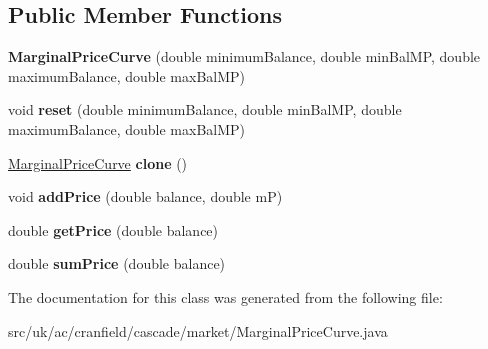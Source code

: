 \subsection*{Public Member Functions}
\begin{DoxyCompactItemize}
\item 
\hypertarget{classuk_1_1ac_1_1cranfield_1_1cascade_1_1market_1_1_marginal_price_curve_a9d3e21ff05f308a2d8e93e5d54ca2c58}{{\bfseries Marginal\-Price\-Curve} (double minimum\-Balance, double min\-Bal\-M\-P, double maximum\-Balance, double max\-Bal\-M\-P)}\label{classuk_1_1ac_1_1cranfield_1_1cascade_1_1market_1_1_marginal_price_curve_a9d3e21ff05f308a2d8e93e5d54ca2c58}

\item 
\hypertarget{classuk_1_1ac_1_1cranfield_1_1cascade_1_1market_1_1_marginal_price_curve_a3e026f921c7166c93d4b73e93561203e}{void {\bfseries reset} (double minimum\-Balance, double min\-Bal\-M\-P, double maximum\-Balance, double max\-Bal\-M\-P)}\label{classuk_1_1ac_1_1cranfield_1_1cascade_1_1market_1_1_marginal_price_curve_a3e026f921c7166c93d4b73e93561203e}

\item 
\hypertarget{classuk_1_1ac_1_1cranfield_1_1cascade_1_1market_1_1_marginal_price_curve_a294216c11b9e3c4a9d4b982fb4ccd98b}{\hyperlink{classuk_1_1ac_1_1cranfield_1_1cascade_1_1market_1_1_marginal_price_curve}{Marginal\-Price\-Curve} {\bfseries clone} ()}\label{classuk_1_1ac_1_1cranfield_1_1cascade_1_1market_1_1_marginal_price_curve_a294216c11b9e3c4a9d4b982fb4ccd98b}

\item 
\hypertarget{classuk_1_1ac_1_1cranfield_1_1cascade_1_1market_1_1_marginal_price_curve_a7dbde5a597d5367b533f8e28a0672c64}{void {\bfseries add\-Price} (double balance, double m\-P)}\label{classuk_1_1ac_1_1cranfield_1_1cascade_1_1market_1_1_marginal_price_curve_a7dbde5a597d5367b533f8e28a0672c64}

\item 
\hypertarget{classuk_1_1ac_1_1cranfield_1_1cascade_1_1market_1_1_marginal_price_curve_a054e3a46b58fa1bc308dbbb0a824c4c4}{double {\bfseries get\-Price} (double balance)}\label{classuk_1_1ac_1_1cranfield_1_1cascade_1_1market_1_1_marginal_price_curve_a054e3a46b58fa1bc308dbbb0a824c4c4}

\item 
\hypertarget{classuk_1_1ac_1_1cranfield_1_1cascade_1_1market_1_1_marginal_price_curve_ada6f9a0bf02eb5b294616d2e394cddaa}{double {\bfseries sum\-Price} (double balance)}\label{classuk_1_1ac_1_1cranfield_1_1cascade_1_1market_1_1_marginal_price_curve_ada6f9a0bf02eb5b294616d2e394cddaa}

\end{DoxyCompactItemize}


The documentation for this class was generated from the following file\-:\begin{DoxyCompactItemize}
\item 
src/uk/ac/cranfield/cascade/market/Marginal\-Price\-Curve.\-java\end{DoxyCompactItemize}

